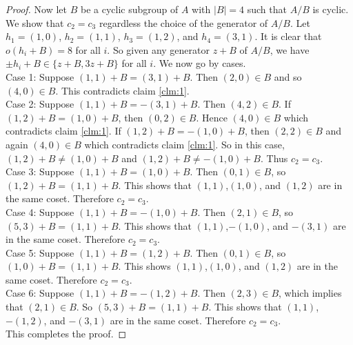 \documentclass[article,dvisp]{amsart}
\theoremstyle{definition}
\theoremstyle{remark}
\numberwithin{equation}{section}
\theoremstyle{lemma}
\begin{document}
\begin{proof}
Now let $B$ be a cyclic subgroup of $A$ with $|B|=4$ such that $A/B$ is cyclic. We show that $c_2=c_3$ regardless the choice of the generator of $A/B$. Let $h_1=(1,0)$, $h_2=(1,1)$, $h_3=(1,2)$, and $h_4=(3,1)$. It is clear that $o(h_{i}+B)=8$ for all $i$. So given any generator $z+B$ of $A/B$, we have $\pm h_i+B\in\{z+B, 3z+B\}$ for all $i$. We now go by cases.\\
Case 1: Suppose  $(1,1)+B=(3,1)+B$. Then $(2,0)\in B$ and so $(4,0)\in B$. This contradicts claim \ref{clm:1}.\\
Case 2: Suppose $(1,1)+B=-(3,1)+B$. Then $(4,2)\in B$. If $(1,2)+B=(1,0)+B$, then $(0,2)\in B$. Hence $(4,0)\in B$ which contradicts claim \ref{clm:1}. If $(1,2)+B=-(1,0)+B$, then $(2,2)\in B$ and again $(4,0)\in B$ which contradicts claim \ref{clm:1}. So in this case, $(1,2)+B\neq (1,0)+B$ and $(1,2)+B\neq-(1,0)+B$. Thus $c_{2}=c_{3}$.\\
Case 3: Suppose $(1,1)+B=(1,0)+B$. Then $(0,1)\in B$, so $(1,2)+B=(1,1)+B$. This shows that $(1,1)$,$(1,0)$, and $(1,2)$ are in the same coset. Therefore $c_2=c_3$.\\
Case 4: Suppose $(1,1)+B=-(1,0)+B$. Then $(2,1)\in B$, so $(5,3)+B=(1,1)+B$. This shows that $(1,1)$,$-(1,0)$, and $-(3,1)$ are in the same coset. Therefore $c_2=c_3$.\\
Case 5: Suppose $(1,1)+B=(1,2)+B$. Then $(0,1)\in B$, so $(1,0)+B=(1,1)+B$. This shows $(1,1)$,$(1,0)$, and $(1,2)$ are in the same coset. Therefore $c_2=c_3$.\\
Case 6: Suppose $(1,1)+B=-(1,2)+B$. Then $(2,3)\in B$, which implies that $(2,1)\in B$. So $(5,3)+B=(1,1)+B$. This shows that $(1,1)$,$-(1,2)$, and $-(3,1)$ are in the same coset. Therefore $c_2=c_3$.\\
This completes the proof.\end{proof}

\newpage
\end{document}
